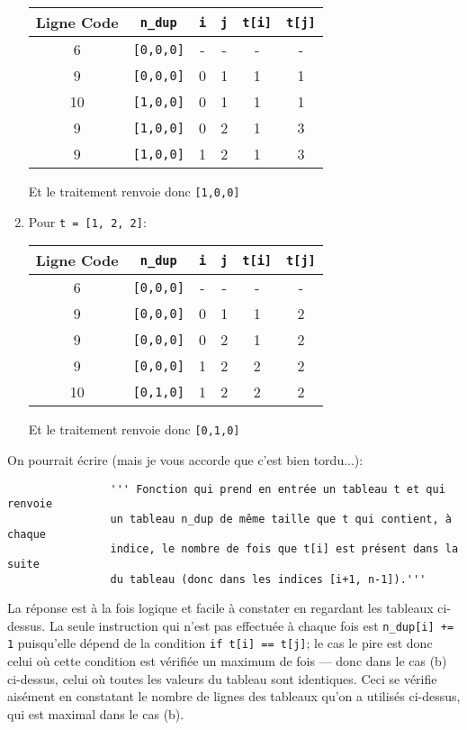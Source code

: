\documentclass[12pt]{article}
\begin{document}
\begin{MaReponse}
\begin{alphenum}
\begin{enumerate}
				\begin{tabular}{|c|c|c|c|c|c|}
					\hline
					\textbf{Ligne Code} & \texttt{n\_dup} & \texttt{i} & \texttt{j} & \texttt{t[i]} & \texttt{t[j]} \\
					\hline
					6 & \texttt{[0,0,0]} & - & - & - & -\\
					\hline 
					9 & \texttt{[0,0,0]} & 0 & 1 & 1 & 1\\
					\hline 
					10 & \texttt{[1,0,0]} & 0 & 1 & 1 & 1\\
					\hline 
					9 & \texttt{[1,0,0]} & 0 & 2 & 1 & 3\\
					\hline 
					9 & \texttt{[1,0,0]} & 1 & 2 & 1 & 3\\
					\hline 
				\end{tabular}
				
				Et le traitement renvoie donc \texttt{[1,0,0]}
				
				\item Pour \texttt{t = [1, 2, 2]}:
				
				\begin{tabular}{|c|c|c|c|c|c|}
					\hline
					\textbf{Ligne Code} & \texttt{n\_dup} & \texttt{i} & \texttt{j} & \texttt{t[i]} & \texttt{t[j]} \\
					\hline
					6 & \texttt{[0,0,0]} & - & - & - & -\\
					\hline 
					9 & \texttt{[0,0,0]} & 0 & 1 & 1 &2\\
					\hline 
					9 & \texttt{[0,0,0]} & 0 & 2 & 1 & 2\\
					\hline 
					9 & \texttt{[0,0,0]} & 1 & 2 & 2 & 2\\
					\hline 
					10 & \texttt{[0,1,0]} & 1 & 2 & 2 & 2\\
					\hline 
				\end{tabular}
				
				Et le traitement renvoie donc \texttt{[0,1,0]}
			\end{enumerate}
			
			\item On pourrait écrire (mais je vous accorde que c'est bien tordu...):
			\begin{verbatim}
				''' Fonction qui prend en entrée un tableau t et qui renvoie 
				un tableau n_dup de même taille que t qui contient, à chaque 
				indice, le nombre de fois que t[i] est présent dans la suite 
				du tableau (donc dans les indices [i+1, n-1]).'''
			\end{verbatim}
			
			\item La réponse est à la fois logique et facile à constater en regardant les tableaux ci-dessus. La seule instruction qui n'est pas effectuée à chaque fois est \texttt{n\_dup[i] += 1} puisqu'elle dépend de la condition \texttt{if t[i] == t[j]}; le cas le pire est donc celui où cette condition est vérifiée un maximum de fois --- donc dans le cas (b) ci-dessus, celui où toutes les valeurs du tableau sont identiques. Ceci se vérifie aisément en constatant le nombre de lignes des tableaux qu'on a utilisés ci-dessus, qui est maximal dans le cas (b).
			

\end{alphenum}
\end{MaReponse}
\end{document}
